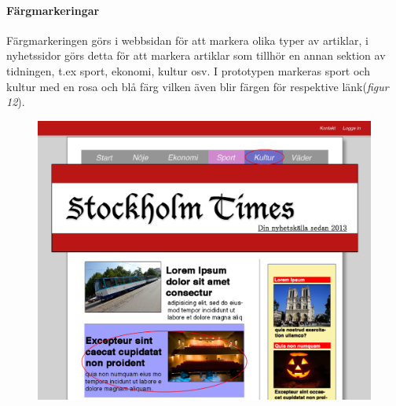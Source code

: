 \documentclass[11pt]{article}
\begin{document}
\paragraph{Färgmarkeringar}\mbox{}

Färgmarkeringen görs i webbsidan för att markera olika typer av artiklar, i nyhetssidor görs detta för att markera artiklar som tillhör en annan sektion av tidningen, t.ex sport, ekonomi, kultur osv. I prototypen markeras sport och kultur med en rosa och blå färg vilken även blir färgen för respektive länk(\textit{figur 12}).
\\

\begin{figure}[H]
\centerline{%
\includegraphics[scale=0.25]{pics/fargdesktop.png}\hspace{2em}%
}
\end{figure}
\end{document}
